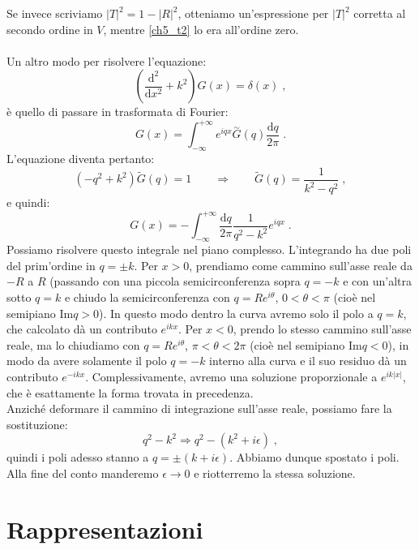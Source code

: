 \documentclass[12pt,a4paper]{report}
\theoremstyle{definition}
\numberwithin{equation}{section}
\newcommand{\diff}[1][]{\mathrm{d}#1}
\begin{document}
Se invece scriviamo $|T|^2=1-|R|^2$, otteniamo un'espressione per $|T|^2$ corretta al secondo ordine in $V$, mentre \eqref{ch5_t2} lo era all'ordine zero. \\
\\
Un altro modo per risolvere l'equazione:
\begin{equation}
\left(\frac{\diff^2}{\diff{x}^2}+k^2\right)G(x)=\delta(x)\;,
\end{equation}
è quello di passare in trasformata di Fourier:
\begin{equation}
G(x)=\int_{-\infty}^{+\infty}e^{iqx}\stackrel{\sim}{G}(q)\frac{\diff{q}}{2\pi}\;.
\end{equation}
L'equazione diventa pertanto:
\begin{equation}
(-q^2+k^2)\tilde{G}(q)=1 \qquad \Longrightarrow \qquad \tilde{G}(q)=\frac{1}{k^2-q^2}\;,
\end{equation}
e quindi:
\begin{equation}
G(x)=-\int_{-\infty}^{+\infty} \frac{\diff{q}}{2\pi}\frac{1}{q^2-k^2}e^{iqx}\;.
\end{equation}
Possiamo risolvere questo integrale nel piano complesso. L'integrando ha due poli del prim'ordine in $q=\pm k$. Per $x>0$, prendiamo come cammino sull'asse reale da $-R$ a $R$ (passando con una piccola semicirconferenza sopra $q=-k$ e con un'altra sotto $q=k$ e chiudo la semicirconferenza con $q=Re^{i\theta}$, $0<\theta<\pi$ (cioè nel semipiano $\mathrm{Im} q>0$). In questo modo dentro la curva avremo solo il polo a $q=k$, che calcolato dà un contributo $e^{ikx}$. Per $x<0$, prendo lo stesso cammino sull'asse reale, ma lo chiudiamo con $q=Re^{i\theta}$, $\pi<\theta<2\pi$ (cioè nel semipiano $\mathrm{Im} q<0$), in modo da avere solamente il polo $q=-k$ interno alla curva e il suo residuo dà un contributo $e^{-ikx}$. Complessivamente, avremo una soluzione proporzionale a $e^{ik|x|}$, che è esattamente la forma trovata in precedenza. \\
Anziché deformare il cammino di integrazione sull'asse reale, possiamo fare la sostituzione:
\begin{equation}
q^2-k^2\Longrightarrow q^2-(k^2+i\epsilon)\;,
\end{equation}
quindi i poli adesso stanno a $q=\pm(k+i\epsilon)$. Abbiamo dunque spostato i poli. Alla fine del conto manderemo $\epsilon\to 0$ e riotterremo la stessa soluzione.
\chapter{Rappresentazioni}
\end{document}
